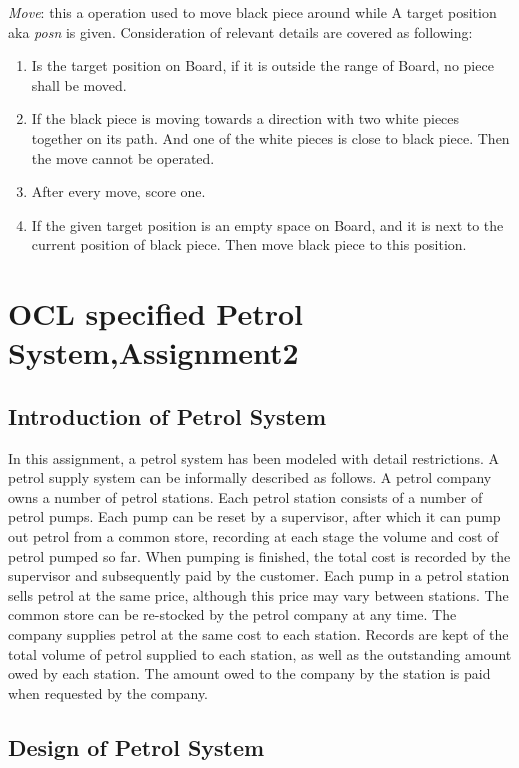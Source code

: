 \textit{Move}: this a operation used to move black piece around while A target position aka \textit{posn} is given. 
Consideration of relevant details are covered as following:
\begin{enumerate}
    \item 	Is the target position on Board, if it is outside the range of Board, no piece shall be moved. 
    \item 	If the black piece is moving towards a direction with two white pieces together on its path. And one of the white pieces is close to black piece. Then the move cannot be operated. 
    \item 	After every move, score one. 
    \item 	If the given target position is an empty space on Board, and it is next to the current position of black piece. Then move black piece to this position. 
\end{enumerate}

\section{OCL specified Petrol System,Assignment2}
\subsection{Introduction of Petrol System}
In this assignment, a petrol system has been modeled with detail restrictions. 
A petrol supply system can be informally described as follows. A petrol company owns a number of petrol stations. Each petrol station consists of a number of petrol pumps. Each pump can be reset by a supervisor, after which it can pump out petrol from a common store, recording at each stage the volume and cost of petrol pumped so far. When pumping is finished, the total cost is recorded by the supervisor and subsequently paid by the customer. Each pump in a petrol station sells petrol at the same price, although this price may vary between stations. The common store can be re-stocked by the petrol company at any time. The company supplies petrol at the same cost to each station. Records are kept of the total volume of petrol supplied to each station, as well as the outstanding amount owed by each station. The amount owed to the company by the station is paid when requested by the company.
\subsection{Design of Petrol System}

